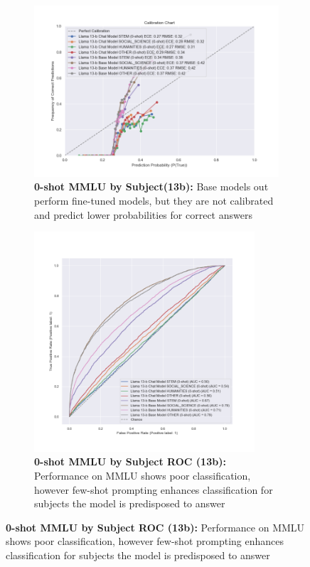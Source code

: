 \documentclass[11pt]{article}
\begin{document}
\begin{figure}
     \centering
     \begin{subfigure}[b]{0.60\textwidth}
         \centering \includegraphics[width=1.1\textwidth]{figures/0-shot-MMLU-subjects-13b.png}
         \caption{\textbf{0-shot MMLU by Subject(13b):}  Base models out perform fine-tuned models, but they are not calibrated and predict lower probabilities for correct answers}
         \label{fig:0-shot-MMLU-subjects-13b}
     \end{subfigure}
     \hfill
     \begin{subfigure}[b]{0.38\textwidth}
         \centering \includegraphics[width=0.9\textwidth]{figures/0-shot-MMLU-subjects-13b-roc.png}
         \caption{\textbf{0-shot MMLU by Subject ROC (13b):} Performance on MMLU shows poor classification, however few-shot prompting enhances classification for subjects the model is predisposed to answer}
         \label{fig:0-shot-MMLU-subjects-13b-roc}
    \end{subfigure}
    

\end{figure}
\end{document}
